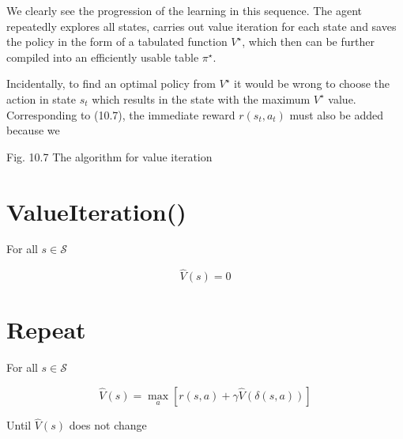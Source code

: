 \documentclass[10pt]{book}
\begin{document}
\begin{center}
\begin{enumerate}
\begin{center}
\begin{center}
\begin{center}
\begin{center}
We clearly see the progression of the learning in this sequence. The agent repeatedly explores all states, carries out value iteration for each state and saves the policy in the form of a tabulated function $V^{\star}$, which then can be further compiled into an efficiently usable table $\pi^{\star}$.

Incidentally, to find an optimal policy from $V^{\star}$ it would be wrong to choose the action in state $s_{t}$ which results in the state with the maximum $V^{\star}$ value. Corresponding to (10.7), the immediate reward $r\left(s_{t}, a_{t}\right)$ must also be added because we

Fig. 10.7 The algorithm for value iteration

\section*{ValueIteration()}
For all $s \in \mathcal{S}$

$$
\hat{V}(s)=0
$$

\section*{Repeat}
For all $s \in \mathcal{S}$

$$
\hat{V}(s)=\max _{a}[r(s, a)+\gamma \hat{V}(\delta(s, a))]
$$

Until $\hat{V}(s)$ does not change


\end{center}
\end{center}
\end{center}
\end{center}
\end{enumerate}
\end{center}
\end{document}
